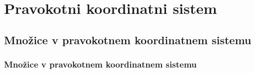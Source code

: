 \section{Pravokotni koordinatni sistem}

\begin{frame}
    \sectionpage
\end{frame}

\begin{frame}
\end{frame}

    \subsection{Množice v pravokotnem koordinatnem sistemu}

        \begin{frame}
            \frametitle{Množice v pravokotnem koordinatnem sistemu}
        \end{frame}


        
